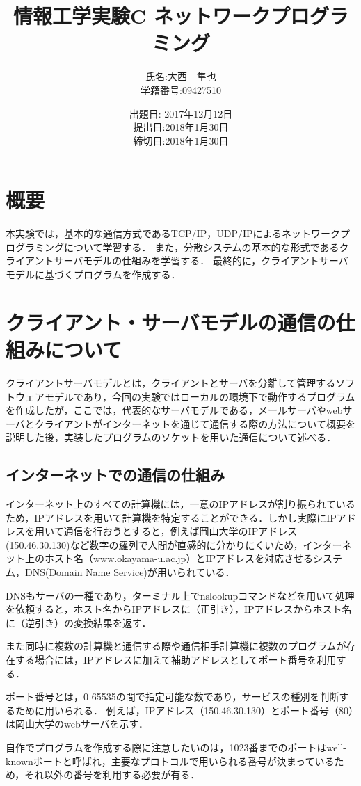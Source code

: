 \documentclass[a4j]{jarticle}
\title{情報工学実験C ネットワークプログラミング}
\author{氏名:大西　隼也 \\学籍番号:09427510}
\date{出題日: 2017年12月12日\\提出日:2018年1月30日 \\締切日:2018年1月30日}
\begin{document}
\maketitle

\section{概要}
本実験では，基本的な通信方式であるTCP/IP，UDP/IPによるネットワークプログラミングについて学習する．
また，分散システムの基本的な形式であるクライアントサーバモデルの仕組みを学習する．
最終的に，クライアントサーバモデルに基づくプログラムを作成する．

\section{クライアント・サーバモデルの通信の仕組みについて}
クライアントサーバモデルとは，クライアントとサーバを分離して管理するソフトウェアモデルであり，今回の実験ではローカルの環境下で動作するプログラムを作成したが，ここでは，代表的なサーバモデルである，メールサーバやwebサーバとクライアントがインターネットを通じて通信する際の方法について概要を説明した後，実装したプログラムのソケットを用いた通信について述べる．

\subsection{インターネットでの通信の仕組み}

インターネット上のすべての計算機には，一意のIPアドレスが割り振られているため，IPアドレスを用いて計算機を特定することができる．しかし実際にIPアドレスを用いて通信を行おうとすると，例えば岡山大学のIPアドレス(150.46.30.130)など数字の羅列で人間が直感的に分かりにくいため，インターネット上のホスト名（www.okayama-u.ac.jp）とIPアドレスを対応させるシステム，DNS(Domain Name Service)が用いられている．

DNSもサーバの一種であり，ターミナル上でnslookupコマンドなどを用いて処理を依頼すると，ホスト名からIPアドレスに（正引き），IPアドレスからホスト名に（逆引き）の変換結果を返す．

また同時に複数の計算機と通信する際や通信相手計算機に複数のプログラムが存在する場合には，IPアドレスに加えて補助アドレスとしてポート番号を利用する．

ポート番号とは，0-65535の間で指定可能な数であり，サービスの種別を判断するために用いられる．
例えば，IPアドレス（150.46.30.130）とポート番号（80）は岡山大学のwebサーバを示す．

自作でプログラムを作成する際に注意したいのは，1023番までのポートはwell-knownポートと呼ばれ，主要なプロトコルで用いられる番号が決まっているため，それ以外の番号を利用する必要が有る．
\end{document}

